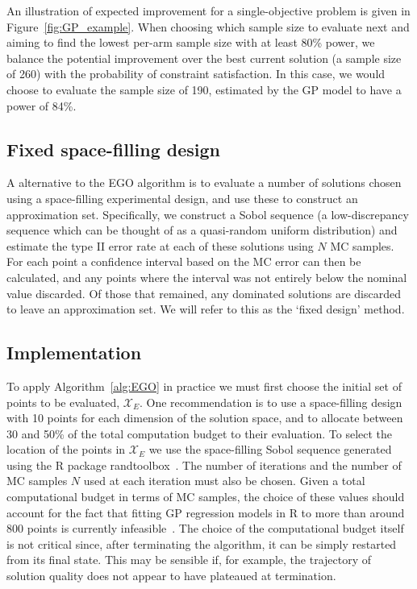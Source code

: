 \documentclass[sagev, Crown]{sagej}
\begin{document}
An illustration of expected improvement for a single-objective problem is given in Figure~\ref{fig:GP_example}. When choosing which sample size to evaluate next and aiming to find the lowest per-arm sample size with at least 80\% power, we balance the potential improvement over the best current solution (a sample size of 260) with the probability of constraint satisfaction. In this case, we would choose to evaluate the sample size of 190, estimated by the GP model to have a power of 84\%.

\subsection{Fixed space-filling design}\label{sec:fixed}

A alternative to the EGO algorithm is to evaluate a number of solutions chosen using a space-filling experimental design, and use these to construct an approximation set. Specifically, we construct a Sobol sequence (a low-discrepancy sequence which can be thought of as a quasi-random uniform distribution) and estimate the type II error rate at each of these solutions using $N$ MC samples. For each point a confidence interval based on the MC error can then be calculated, and any points where the interval was not entirely below the nominal value discarded. Of those that remained, any dominated solutions are discarded to leave an approximation set. We will refer to this as the `fixed design' method.

\subsection{Implementation}\label{sec:implementation}

To apply Algorithm~\ref{alg:EGO} in practice we must first choose the initial set of points to be evaluated, $\mathcal{X}_{E}$. One recommendation is to use a space-filling design with 10 points for each dimension of the solution space, and to allocate between 30 and 50\% of the total computation budget to their evaluation\cite{Picheny2010}. To select the location of the points in $\mathcal{X}_{E}$ we use the space-filling Sobol sequence generated using the R package randtoolbox~\cite{Dutang2015}. The number of iterations and the number of MC samples $N$ used at each iteration must also be chosen. Given a total computational budget in terms of MC samples, the choice of these values should account for the fact that fitting GP regression models in R to more than around 800 points is currently infeasible~\cite{Chevalier2014}. The choice of the computational budget itself is not critical since, after terminating the algorithm, it can be simply restarted from its final state. This may be sensible if, for example, the trajectory of solution quality does not appear to have plateaued at termination.
\end{document}
